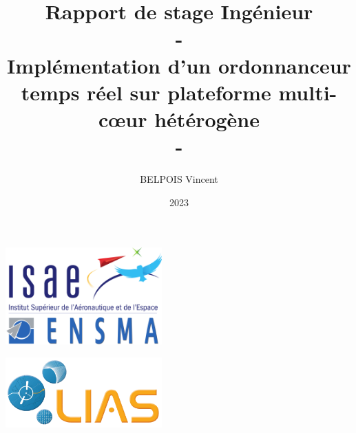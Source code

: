 \documentclass{article}
\title{Rapport de stage Ingénieur \\-\\Implémentation d'un ordonnanceur temps réel sur
plateforme multi-cœur hétérogène\\-}
\author{BELPOIS Vincent}
\begin{document}
\date{2023}
\maketitle
\thispagestyle{empty}

\vspace{10mm}

\begin{center}
    \includegraphics[width = 6cm]{Images/logo_ensma.png}
    \end{center}
    \vspace{2cm}
    \begin{center}
        \includegraphics[width = 6cm]{Images/logo_LIAS.png}
    \end{center}
    \newpage
    \tableofcontents
    
    
    \newpage
    
\end{document}
